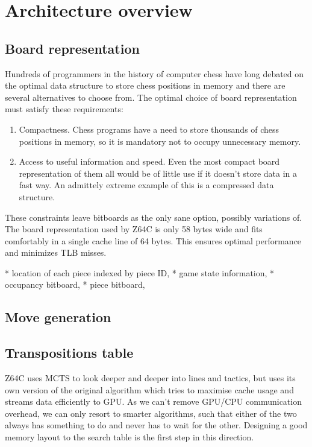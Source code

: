 \chapter{Architecture overview}
\section{Board representation}

Hundreds of programmers in the history of computer chess have long debated on
the optimal data structure to store chess positions in memory and there are
several alternatives to choose from. The optimal choice of board representation
must satisfy these requirements:

\begin{enumerate}
\item Compactness. Chess programs have a need to store thousands of chess
positions in memory, so it is mandatory not to occupy unnecessary memory.
\item Access to useful information and speed. Even the most compact board
representation of them all would be of little use if it doesn't store data in a
fast way. An admittely extreme example of this is a compressed data structure.
\end{enumerate}

These constraints leave bitboards as the only sane option, possibly variations
of.
The board representation used by Z64C is only 58 bytes wide and fits comfortably
in a single cache line of 64 bytes. This ensures optimal performance and
minimizes TLB misses.

* location of each piece indexed by piece ID,
* game state information,
* occupancy bitboard,
* piece bitboard,

\section{Move generation}

\section{Transpositions table}
Z64C uses MCTS to look deeper and deeper into lines and tactics, but uses its
own version of the original algorithm which tries to maximise cache usage and
streams data efficiently to GPU. As we can't remove GPU/CPU communication
overhead, we can only resort to smarter algorithms, such that either of the two
always has something to do and never has to wait for the other. Designing a good
memory layout to the search table is the first step in this direction.

